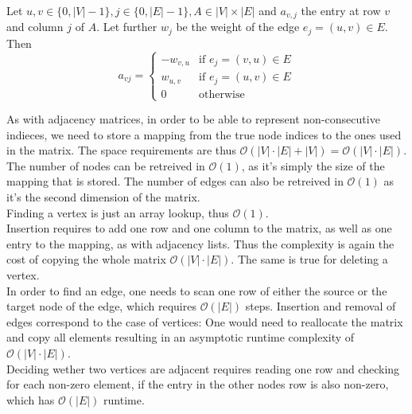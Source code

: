         Let $u,v \in \{0, |V|-1\}, j \in \{0, |E|-1\}, A \in |V| \times |E|$ and $a_{v,j}$ the entry at row $v$ and column $j$ of $A$. Let further $w_j$ be the weight of the edge $e_j = (u,v) \in E$. Then 
        \[         a_{vj} = \begin{cases}
                     -w_{v,u} & \text{if } e_j = (v,u) \in E \\
                     w_{u,v} & \text{if } e_j = (u,v) \in E \\
                     0 & \text{otherwise}
                    \end{cases}
        \]
        
        As with adjacency matrices, in order to be able to represent non-consecutive indieces, we need to store a mapping from the true node indices to the ones used in the matrix.
        The space requirements are thus $\mathcal{O}(|V| \cdot |E| + |V|) = \mathcal{O}(|V| \cdot |E|)$. \\
        
        The number of nodes can be retreived in $\mathcal{O}(1)$, as it's simply the size of the mapping that is stored.
        The number of edges can also be retreived in $\mathcal{O}(1)$ as it's the second dimension of the matrix.\\

        Finding a vertex is just an array lookup, thus $\mathcal{O}(1)$. \\

        Insertion requires to add one row and one column to the matrix, as well as one entry to the mapping, as with adjacency lists. Thus the complexity is again the cost of copying the whole matrix $\mathcal{O}(|V| \cdot |E|)$. The same is true for deleting a vertex. \\
        
        In order to find an edge, one needs to scan one row of either the source or the target node of the edge, which requires $\mathcal{O}(|E|)$ steps.
        Insertion and removal of edges correspond to the case of vertices: One would need to reallocate the matrix and copy all elements resulting in an asymptotic runtime complexity of $\mathcal{O}(|V| \cdot |E|)$. \\
        
        Deciding wether two vertices are adjacent requires reading one row and checking for each non-zero element, if the entry in the other nodes row is also non-zero, which has $\mathcal{O}(|E|)$ runtime.\\
        
